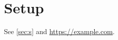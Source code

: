 \documentclass{article}
\begin{document}
\section{Setup}\label{sec:s}
See \autoref{sec:s} and \url{https://example.com}.
\end{document}

